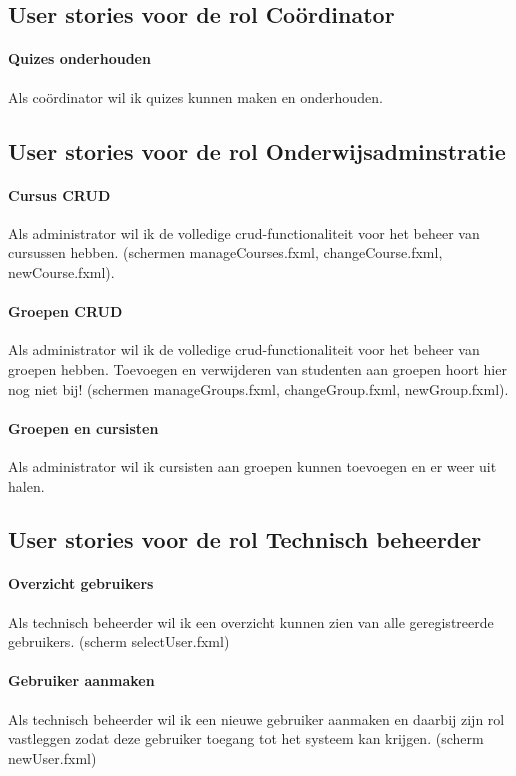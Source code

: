 \documentclass[11pt, a4paper]{article}
\begin{document}
\subsection{User stories voor de rol Co\"ordinator}

\paragraph{Quizes onderhouden}
Als co\"ordinator wil ik quizes kunnen maken en onderhouden.

\subsection{User stories voor de rol Onderwijsadminstratie}

\paragraph{Cursus CRUD}
Als administrator wil ik de volledige crud-functionaliteit voor het beheer van cursussen hebben. (schermen manageCourses.fxml, changeCourse.fxml, newCourse.fxml).

\paragraph{Groepen CRUD}
Als administrator wil ik de volledige crud-functionaliteit voor het beheer van groepen hebben. Toevoegen en verwijderen van studenten aan groepen hoort hier nog niet bij! (schermen manageGroups.fxml, changeGroup.fxml, newGroup.fxml).

\paragraph{Groepen en cursisten}
Als administrator wil ik cursisten aan groepen kunnen toevoegen en er weer uit halen.

\subsection{User stories voor de rol Technisch beheerder}

\paragraph{Overzicht gebruikers} Als technisch beheerder wil ik een overzicht kunnen zien van alle geregistreerde gebruikers. (scherm selectUser.fxml)

\paragraph{Gebruiker aanmaken} Als technisch beheerder wil ik een nieuwe gebruiker aanmaken en daarbij zijn rol vastleggen zodat deze gebruiker toegang tot het systeem kan krijgen. (scherm newUser.fxml)
\end{document}

